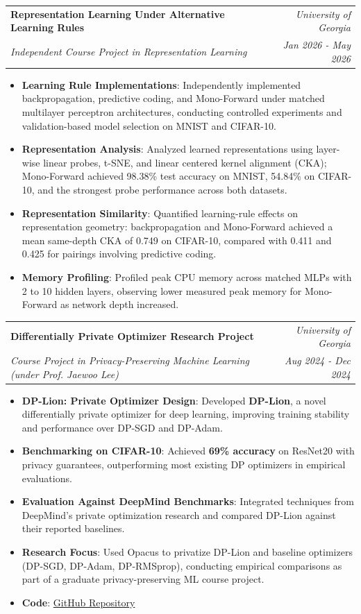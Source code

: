 \documentclass[a4paper,10pt]{article}
\makeatletter
\newcommand{\resumeSubheading}[4]{
  \Needspace{10\baselineskip}
  \item
    \begin{tabular*}{0.97\textwidth}{l@{\extracolsep{\fill}}r}
      \textbf{#1} & \textit{#2} \\
      \textit{\small#3} & \textit{\small#4} \\
    \end{tabular*}
}
\newcommand{\resumeItem}[2]{\item \small{\textbf{#1}{: #2 \vspace{-2pt}}}}
\newcommand{\resumeItemListStart}{\begin{itemize}}
\newcommand{\resumeItemListEnd}{\end{itemize}}
\makeatother
\begin{document}
    \resumeSubheading
        {Representation Learning Under Alternative Learning Rules}{University of Georgia}
        {Independent Course Project in Representation Learning}{Jan 2026 - May 2026}
        \resumeItemListStart
            \resumeItem{Learning Rule Implementations}
                {Independently implemented backpropagation, predictive coding, and Mono-Forward under matched multilayer perceptron architectures, conducting controlled experiments and validation-based model selection on MNIST and CIFAR-10.}
            \resumeItem{Representation Analysis}
                {Analyzed learned representations using layer-wise linear probes, t-SNE, and linear centered kernel alignment (CKA); Mono-Forward achieved 98.38\% test accuracy on MNIST, 54.84\% on CIFAR-10, and the strongest probe performance across both datasets.}
            \resumeItem{Representation Similarity}
                {Quantified learning-rule effects on representation geometry: backpropagation and Mono-Forward achieved a mean same-depth CKA of 0.749 on CIFAR-10, compared with 0.411 and 0.425 for pairings involving predictive coding.}
            \resumeItem{Memory Profiling}
                {Profiled peak CPU memory across matched MLPs with 2 to 10 hidden layers, observing lower measured peak memory for Mono-Forward as network depth increased.}
        \resumeItemListEnd

    \resumeSubheading
        {Differentially Private Optimizer Research Project}{University of Georgia}
        {Course Project in Privacy-Preserving Machine Learning (under Prof. Jaewoo Lee)}{Aug 2024 - Dec 2024}
        \resumeItemListStart
            \resumeItem{DP-Lion: Private Optimizer Design}
                {Developed \textbf{DP-Lion}, a novel differentially private optimizer for deep learning, improving training stability and performance over DP-SGD and DP-Adam.}
            \resumeItem{Benchmarking on CIFAR-10}
                {Achieved \textbf{69\% accuracy} on ResNet20 with privacy guarantees, outperforming most existing DP optimizers in empirical evaluations.}
            \resumeItem{Evaluation Against DeepMind Benchmarks}
                {Integrated techniques from DeepMind's private optimization research and compared DP-Lion against their reported baselines.}
            \resumeItem{Research Focus}
                {Used Opacus to privatize DP-Lion and baseline optimizers (DP-SGD, DP-Adam, DP-RMSprop), conducting empirical comparisons as part of a graduate privacy-preserving ML course project.}
            \resumeItem{Code}
                {\href{https://github.com/CS8960-Privacy-Preserving-Data-Analysis/final-project}{GitHub Repository}}
        \resumeItemListEnd
\end{document}
